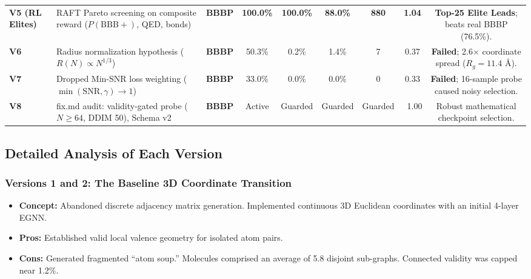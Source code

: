 \documentclass[11pt, a4paper]{article}
\begin{document}
\begin{table}[H]
{\begin{tabular}{llccccccc}
\textbf{V5 (RL Elites)} & RAFT Pareto screening on composite reward ($P(\text{BBB}+)$, QED, bonds) & \textbf{BBBP} & \textbf{100.0\%} & \textbf{100.0\%} & \textbf{88.0\%} & \textbf{880} & \textbf{1.04} & \textbf{Top-25 Elite Leads}; beats real BBBP (76.5\%). \\
\textbf{V6} & Radius normalization hypothesis ($R(N) \propto N^{1/3}$) & \textbf{BBBP} & 50.3\% & 0.2\% & 1.4\% & 7 & 0.37 & \textbf{Failed}; 2.6$\times$ coordinate spread ($R_g = 11.4\text{ \AA}$). \\
\textbf{V7} & Dropped Min-SNR loss weighting ($\min(\text{SNR}, \gamma) \to 1$) & \textbf{BBBP} & 33.0\% & 0.0\% & 0.0\% & 0 & 0.33 & \textbf{Failed}; 16-sample probe caused noisy selection. \\
\textbf{V8} & fix.md audit: validity-gated probe ($N \ge 64$, DDIM 50), Schema v2 & \textbf{BBBP} & Active & Guarded & Guarded & Guarded & ~1.00 & Robust mathematical checkpoint selection. \\
\bottomrule
\end{tabular}
}
\end{table}

\subsection{Detailed Analysis of Each Version}

\subsubsection{Versions 1 and 2: The Baseline 3D Coordinate Transition}
\begin{itemize}[noitemsep]
    \item \textbf{Concept:} Abandoned discrete adjacency matrix generation. Implemented continuous 3D Euclidean coordinates with an initial 4-layer EGNN.
    \item \textbf{Pros:} Established valid local valence geometry for isolated atom pairs.
    \item \textbf{Cons:} Generated fragmented ``atom soup.'' Molecules comprised an average of 5.8 disjoint sub-graphs. Connected validity was capped near 1.2\%.
\end{itemize}
\end{document}
